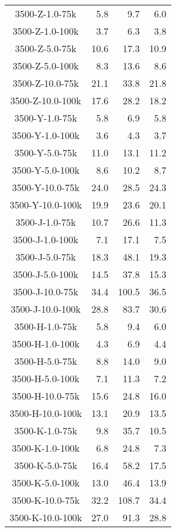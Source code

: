 \begin{longtable}{crrr}
    3500-Z-1.0-75k &   5.8 &    9.7 &   6.0 \\
    3500-Z-1.0-100k &   3.7 &    6.3 &   3.8 \\
    3500-Z-5.0-75k &  10.6 &   17.3 &  10.9 \\
    3500-Z-5.0-100k &   8.3 &   13.6 &   8.6 \\
    3500-Z-10.0-75k &  21.1 &   33.8 &  21.8 \\
    3500-Z-10.0-100k &  17.6 &   28.2 &  18.2 \\
    3500-Y-1.0-75k &   5.8 &    6.9 &   5.8 \\
    3500-Y-1.0-100k &   3.6 &    4.3 &   3.7 \\
    3500-Y-5.0-75k &  11.0 &   13.1 &  11.2 \\
    3500-Y-5.0-100k &   8.6 &   10.2 &   8.7 \\
    3500-Y-10.0-75k &  24.0 &   28.5 &  24.3 \\
    3500-Y-10.0-100k &  19.9 &   23.6 &  20.1 \\
    3500-J-1.0-75k &  10.7 &   26.6 &  11.3 \\
    3500-J-1.0-100k &   7.1 &   17.1 &   7.5 \\
    3500-J-5.0-75k &  18.3 &   48.1 &  19.3 \\
    3500-J-5.0-100k &  14.5 &   37.8 &  15.3 \\
    3500-J-10.0-75k &  34.4 &  100.5 &  36.5 \\
    3500-J-10.0-100k &  28.8 &   83.7 &  30.6 \\
    3500-H-1.0-75k &   5.8 &    9.4 &   6.0 \\
    3500-H-1.0-100k &   4.3 &    6.9 &   4.4 \\
    3500-H-5.0-75k &   8.8 &   14.0 &   9.0 \\
    3500-H-5.0-100k &   7.1 &   11.3 &   7.2 \\
    3500-H-10.0-75k &  15.6 &   24.8 &  16.0 \\
    3500-H-10.0-100k &  13.1 &   20.9 &  13.5 \\
    3500-K-1.0-75k &   9.8 &   35.7 &  10.5 \\
    3500-K-1.0-100k &   6.8 &   24.8 &   7.3 \\
    3500-K-5.0-75k &  16.4 &   58.2 &  17.5 \\
    3500-K-5.0-100k &  13.0 &   46.4 &  13.9 \\
    3500-K-10.0-75k &  32.2 &  108.7 &  34.4 \\
    3500-K-10.0-100k &  27.0 &   91.3 &  28.8 \\

\end{longtable}
